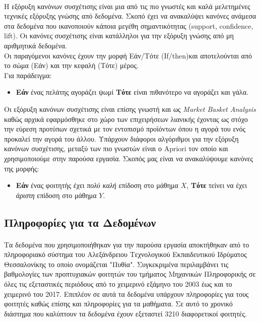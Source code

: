 \documentclass[12pt,a4paper,final]{article}
\begin{document}
\paragraph{}
Η εξόρυξη κανόνων συσχέτισης είναι μια από τις πιο γνωστές και καλά μελετημένες τεχνικές εξόρυξης γνώσης από δεδομένα\foreignlanguage{english}{\cite{assoc_agrawal}}. Σκοπό έχει να ανακαλύψει κανόνες ανάμεσα στα δεδομένα που ικανοποιούν κάποια μεγέθη σημαντικότητας (\foreignlanguage{english}{support, confidence, lift}). Οι κανόνες συσχέτισης είναι κατάλληλοι για την εξόρυξη γνώσης από μη αριθμητικά δεδομένα.\\
Οι παραγόμενοι κανόνες έχουν την μορφή Εάν/Τότε (\foreignlanguage{english}{If/then})και αποτελούνται από το σώμα (Εάν) και την κεφαλή (Τότε) μέρος.\\
Για παράδειγμα:
\begin{itemize}
\item \textbf{Εάν}  ένας πελάτης αγοράζει ψωμί \textbf{Τότε} είναι πιθανότερο να αγοράζει και γάλα.  
\end{itemize}

 Οι εξόρυξη κανόνων συσχέτισης είναι επίσης γνωστή και ως \foreignlanguage{english}{\textit{Market Basket Analysis}} καθώς αρχικά εφαρμόσθηκε στο χώρο των επιχειρήσεων λιανικής\foreignlanguage{english}{\cite{apriori_basket2}} έχοντας ως στόχο την εύρεση προτύπων σχετικά με τον εντοπισμό προϊόντων όπου η αγορά του ενός προκαλεί την αγορά του άλλου. Υπάρχουν διάφοροι αλγόριθμοι για την εξόρυξη κανόνων συσχέτισης, μεταξύ των πιο γνωστών είναι ο  \foreignlanguage{english}{Apriori} τον οποίο και  χρησιμοποιούμε στην παρούσα εργασία. Σκοπός μας είναι να ανακαλύψουμε κανόνες της μορφής:
 \begin{itemize}
\item \textbf{Εάν} ένας φοιτητής έχει \textit{πολύ καλή} επίδοση στο μάθημα $X$, \textbf{Τότε} τείνει να έχει \textit{άριστη} επίδοση στο μάθημα $Y$. 
 \end{itemize}


\subsection{Πληροφορίες για τα Δεδομένων}
\paragraph{}
 Τα δεδομένα που χρησιμοποιήθηκαν  για την παρούσα εργασία  αποκτήθηκαν από το πληροφοριακό σύστημα του Αλεξάνδρειου Τεχνολογικού Εκπαιδευτικού Ιδρύματος Θεσσαλονίκης το οποίο ονομάζεται "Πυθία". Συγκεκριμένα περιλαμβάνει τις βαθμολογίες των προπτυχιακών φοιτητών του τμήματος Μηχανικών Πληροφορικής σε όλες τις εξεταστικές περιόδους από το χειμερινό  εξάμηνο του 2003 έως και το χειμερινό του 2017. Επιπλέον σε αυτά τα δεδομένα υπάρχουν πληροφορίες για τους φοιτητές  καθώς επίσης και πληροφορίες  για τα μαθήματα. Σε αυτό το χρονικό διάστημα που καλύπτουν τα δεδομένα έχουν εξεταστεί 3210 διαφορετικοί φοιτητές.
\end{document}
